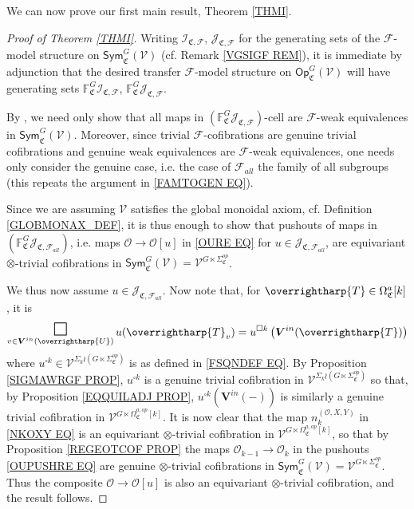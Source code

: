 \documentclass[a4paper,10pt
,draft
]{article}%
\numberwithin{equation}{section}
\numberwithin{figure}{section}
\theoremstyle{definition} %
\newcommand{\vect}[1]{\text{\overrightharp{\ensuremath{#1}}}}
\newcommand{\F}{\ensuremath{\mathcal F}}
\newcommand{\V}{\ensuremath{\mathcal V}}
\renewcommand{\O}{\ensuremath{\mathcal O}}
\newcommand{\1}{\ensuremath{\mathbbm 1}}%
\begin{document}
We can now prove our first main result, Theorem \ref{THMI}.


\begin{proof}[Proof of Theorem \ref{THMI}]    
Writing
$\mathcal{I}_{\mathfrak{C},\mathcal{F}}$,
$\mathcal{J}_{\mathfrak{C},\mathcal{F}}$
for the generating sets
of the $\F$-model structure on 
$\mathsf{Sym}^G_{\mathfrak{C}}(\V)$
(cf. Remark \ref{VGSIGF REM}),
it is immediate by adjunction
that the desired transfer $\F$-model structure
on $\mathsf{Op}^G_{\mathfrak{C}}(\V)$
will have generating sets 
$\mathbb{F}^G_{\mathfrak{C}}\mathcal{I}_{\mathfrak{C},\mathcal{F}}$,
$\mathbb{F}^G_{\mathfrak{C}}\mathcal{J}_{\mathfrak{C},\mathcal{F}}$.
	 
By \cite[Thm. 11.3.2]{Hir03},
we need only show that all maps in
$(\mathbb{F}^G_{\mathfrak{C}}\mathcal{J}_{\mathfrak{C},\mathcal{F}})$-cell
are $\F$-weak equivalences in $\mathsf{Sym}^G_{\mathfrak{C}}(\V)$.
Moreover, since trivial $\F$-cofibrations are genuine trivial cofibrations and 
genuine weak equivalences are $\F$-weak equivalences, one needs only consider the genuine case, i.e. the case of $\F_{all}$ the family of all subgroups (this repeats the argument in \eqref{FAMTOGEN EQ}).


Since we are assuming $\V$ satisfies the global monoidal axiom,
cf. Definition \ref{GLOBMONAX_DEF}, 
it is thus enough to show that pushouts of maps in 
$(\mathbb{F}^G_{\mathfrak{C}}\mathcal{J}_{\mathfrak{C},\mathcal{F}_{all}})$,
i.e. maps $\O \to \O[u]$ in \eqref{OURE EQ}
for $u \in \mathcal{J}_{\mathfrak{C},\mathcal{F}_{all}}$,
are equivariant $\otimes$-trivial cofibrations
in $\mathsf{Sym}^G_{\mathfrak{C}}(\V) = \V^{G \ltimes \Sigma^{op}_{\mathfrak{C}}}$.



We thus now assume 
$u \in \mathcal{J}_{\mathfrak{C},\mathcal{F}_{all}}$.
Now note that, for $\vect{T} \in \Omega^a_{\mathfrak{C}}[k]$,
it is
\[
	\mathop{\mathlarger{\mathlarger{\mathlarger{\square}}}}\limits_{v \in \boldsymbol{V}^{in}(\vect{U})} u(\vect{T}_v)
=
	u^{\square k}\left( \boldsymbol{V}^{in}(\vect T) \right)
\]
where
$u^{\square k} \in 
\V^{\Sigma_k \wr (G \ltimes \Sigma^{op}_{\mathfrak{C}})}$
is as defined in \eqref{FSQNDEF EQ}.
By Proposition \ref{SIGMAWRGF PROP},
$u^{\square k}$ is a genuine trivial cofibration in 
$\V^{\Sigma_k \wr (G \ltimes \Sigma^{op}_{\mathfrak{C}})}$
so that,
by Proposition \ref{EQQUILADJ PROP},
$u^{\square k}(\boldsymbol{V}^{in}(-))$
is similarly a genuine trivial cofibration in 
$\V^{G \ltimes \Omega^{a,op}_{\mathfrak{C}}[k]}$.
It is now clear that
the map $n_k^{(\O,X,Y)}$ in \eqref{NKOXY EQ}
is an equivariant
$\otimes$-trivial cofibration in 
$\V^{G \ltimes \Omega^{a,op}_{\mathfrak{C}}[k]}$,
so that by 
Proposition \ref{REGEOTCOF PROP}
the maps $\O_{k-1} \to \O_{k}$
in the pushouts \eqref{OUPUSHRE EQ}
are genuine $\otimes$-trivial cofibrations
in 
$\mathsf{Sym}^G_{\mathfrak{C}}(\V)
= \V^{G\ltimes \Sigma^{op}_{\mathfrak{C}}}$.
Thus the composite $\O \to \O[u]$
is also an
equivariant $\otimes$-trivial cofibration,
and the result follows.
\end{proof}
\end{document}
